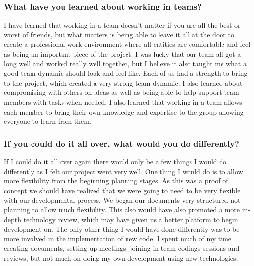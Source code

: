 \subsubsection{What have you learned about working in teams?}
I have learned that working in a team doesn't matter if you are all the best or worst of friends, but what matters is being able to leave it all at the door to create a professional work environment where all entities are comfortable and feel as being an important piece of the project. I was lucky that our team all got a long well and worked really well together, but I believe it also taught me what a good team dynamic should look and feel like. Each of us had a strength to bring to the project, which created a very strong team dynamic. I also learned about compromising with others on ideas as well as being able to help support team members with tasks when needed. I also learned that working in a team allows each member to bring their own knowledge and expertise to the group allowing everyone to learn from them.\\ 

\subsubsection{If you could do it all over, what would you do differently?}
If I could do it all over again there would only be a few things I would do differently as I felt our project went very well. One thing I would do is to allow more flexibility from the beginning planning stages. As this was a proof of concept we should have realized that we were going to need to be very flexible with our developmental process. We began our documents very structured not planning to allow much flexibility. This also would have also promoted a more in-depth technology review, which may have given us a better platform to begin development on. The only other thing I would have done differently was to be more involved in the implementation of new code. I spent much of my time creating documents, setting up meetings, joining in team codings sessions and reviews, but not much on doing my own development using new technologies.\\
